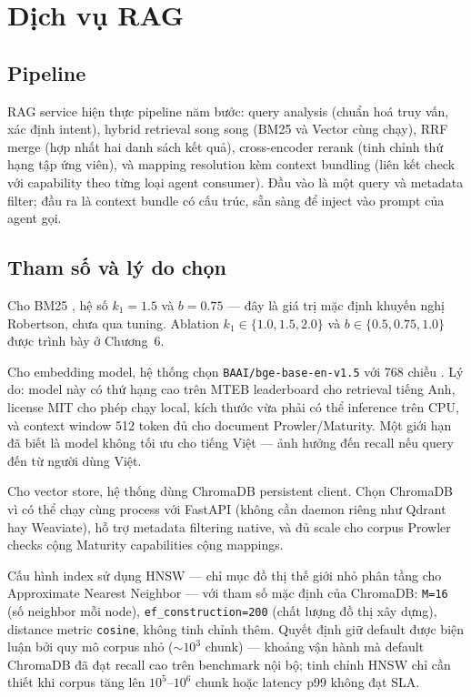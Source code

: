 
\section{Dịch vụ RAG}
\label{sec:rag_impl}

\subsection{Pipeline}

RAG service hiện thực pipeline năm bước: query analysis (chuẩn hoá truy vấn, xác định intent), hybrid retrieval song song (BM25 và Vector cùng chạy), RRF merge (hợp nhất hai danh sách kết quả), cross-encoder rerank (tinh chỉnh thứ hạng tập ứng viên), và mapping resolution kèm context bundling (liên kết check với capability theo từng loại agent consumer). Đầu vào là một query và metadata filter; đầu ra là context bundle có cấu trúc, sẵn sàng để inject vào prompt của agent gọi.

\subsection{Tham số và lý do chọn}

Cho BM25 \cite{robertson2009bm25}, hệ số $k_1 = 1.5$ và $b = 0.75$ — đây là giá trị mặc định khuyến nghị Robertson, chưa qua tuning. Ablation $k_1 \in \{1.0, 1.5, 2.0\}$ và $b \in \{0.5, 0.75, 1.0\}$ được trình bày ở Chương~6.

Cho embedding model, hệ thống chọn \texttt{BAAI/bge-base-en-v1.5} với 768 chiều \cite{bge2024}. Lý do: model này có thứ hạng cao trên MTEB leaderboard cho retrieval tiếng Anh, license MIT cho phép chạy local, kích thước vừa phải có thể inference trên CPU, và context window 512 token đủ cho document Prowler/Maturity. Một giới hạn đã biết là model không tối ưu cho tiếng Việt — ảnh hưởng đến recall nếu query đến từ người dùng Việt.

Cho vector store, hệ thống dùng ChromaDB persistent client. Chọn ChromaDB vì có thể chạy cùng process với FastAPI (không cần daemon riêng như Qdrant hay Weaviate), hỗ trợ metadata filtering native, và đủ scale cho corpus Prowler checks cộng Maturity capabilities cộng mappings.

Cấu hình index sử dụng HNSW \cite{malkov2018hnsw} --- chỉ mục đồ thị thế giới nhỏ phân tầng cho Approximate Nearest Neighbor --- với tham số mặc định của ChromaDB: \texttt{M=16} (số neighbor mỗi node), \texttt{ef\_construction=200} (chất lượng đồ thị xây dựng), distance metric \texttt{cosine}, không tinh chỉnh thêm. Quyết định giữ default được biện luận bởi quy mô corpus nhỏ ($\sim 10^3$ chunk) --- khoảng vận hành mà default ChromaDB đã đạt recall cao trên benchmark nội bộ; tinh chỉnh HNSW chỉ cần thiết khi corpus tăng lên $10^5$--$10^6$ chunk hoặc latency p99 không đạt SLA.


